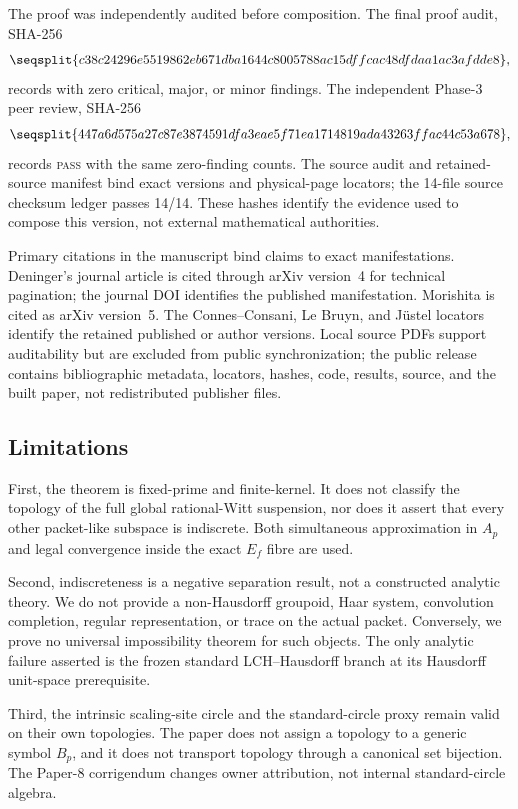 \documentclass[11pt]{article}
\theoremstyle{definition}
\newcommand{\coord}[1]{\texttt{\detokenize{#1}}}
\newcommand{\PASS}{\textsc{pass}}
\begin{document}
The proof was independently audited before composition.  The final proof audit, SHA-256
\[
 \seqsplit{c38c24296e5519862eb671dba1644c8005788ac15dffcac48dfdaa1ac3afdde8},
\]
records \coord{CONFIRM_STRONG} with zero critical, major, or minor findings.  The independent Phase-3 peer review, SHA-256
\[
 \seqsplit{447a6d575a27c87e3874591dfa3eae5f71ea1714819ada43263ffac44c53a678},
\]
records \PASS{} with the same zero-finding counts.  The source audit and retained-source manifest bind exact versions and physical-page locators; the 14-file source checksum ledger passes 14/14.  These hashes identify the evidence used to compose this version, not external mathematical authorities.

Primary citations in the manuscript bind claims to exact manifestations.  Deninger's journal article is cited through arXiv version~4 for technical pagination; the journal DOI identifies the published manifestation.  Morishita is cited as arXiv version~5.  The Connes--Consani, Le Bruyn, and Jüstel locators identify the retained published or author versions.  Local source PDFs support auditability but are excluded from public synchronization; the public release contains bibliographic metadata, locators, hashes, code, results, source, and the built paper, not redistributed publisher files.

\subsection{Limitations}

First, the theorem is fixed-prime and finite-kernel.  It does not classify the topology of the full global rational-Witt suspension, nor does it assert that every other packet-like subspace is indiscrete.  Both simultaneous approximation in \(A_p\) and legal convergence inside the exact \(E_f\) fibre are used.

Second, indiscreteness is a negative separation result, not a constructed analytic theory.  We do not provide a non-Hausdorff groupoid, Haar system, convolution completion, regular representation, or trace on the actual packet.  Conversely, we prove no universal impossibility theorem for such objects.  The only analytic failure asserted is the frozen standard LCH--Hausdorff branch at its Hausdorff unit-space prerequisite.

Third, the intrinsic scaling-site circle and the standard-circle proxy remain valid on their own topologies.  The paper does not assign a topology to a generic symbol \(B_p\), and it does not transport topology through a canonical set bijection.  The Paper-8 corrigendum changes owner attribution, not internal standard-circle algebra.
\end{document}
